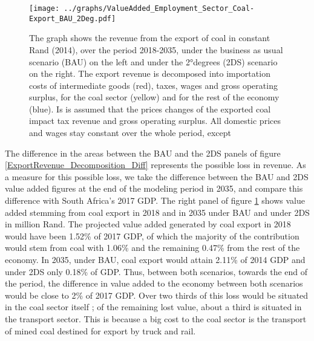 \documentclass[12pt,english]{article}
\begin{document}
\begin{figure}[!t]
	\centering
	\hspace{-10pt}\texttt{[image: ../graphs/ValueAdded\_Employment\_Sector\_Coal-Export\_BAU\_2Deg.pdf]}
	\caption{\label{ValueAdded_Employment_Sector_Coal-Export_BAU_2DS}\small The graph shows the revenue from the export of coal in constant Rand (2014), over the period 2018-2035, under the business as usual scenario (BAU) on the left and under the 2°degrees (2DS) scenario on the right. The export revenue is decomposed into importation costs of intermediate goods (red), taxes, wages and gross operating surplus, for the coal sector (yellow) and for the rest of the economy (blue). Is is assumed that the prices changes of the exported coal impact tax revenue and gross operating surplus. All domestic prices and wages stay constant over the whole period, except  }
\end{figure}

The difference in the areas between the BAU and the 2DS panels of figure \ref{ExportRevenue_Decomposition_Diff} represents the possible loss in revenue. As a measure for this possible loss, we take the difference between the BAU and 2DS value added figures at the end of the modeling period in 2035, and compare this difference with South Africa's 2017 GDP. %
The right panel of figure \ref{ValueAdded_Employment_Sector_Coal-Export_BAU_2DS} shows value added stemming from coal export in 2018 and in 2035 under BAU and under 2DS in million Rand. %
The projected value added generated by coal export in 2018 would have been 1.52\% of 2017 GDP, of which the majority of the contribution would stem from coal with 1.06\% and the remaining 0.47\% from the rest of the economy. In 2035, under BAU, coal export would attain 2.11\% of 2014 GDP and under 2DS only 0.18\% of GDP. Thus, between both scenarios, towards the end of the period, the difference in value added to the economy between both scenarios would be close to 2\% of 2017 GDP. Over two thirds of this loss would be situated in the coal sector itself ; of the remaining lost value, about a third is situated in the transport sector. This is because a big cost to the coal sector is the transport of mined coal destined for export by truck and rail. 
\end{document}
